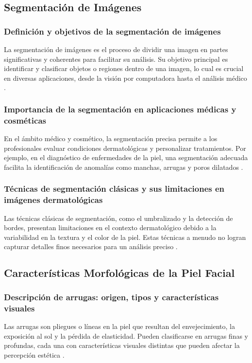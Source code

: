 \subsection{Segmentación de Imágenes}

\subsubsection{Definición y objetivos de la segmentación de imágenes}
La segmentación de imágenes es el proceso de dividir una imagen en partes significativas y coherentes para facilitar su análisis. Su objetivo principal es identificar y clasificar objetos o regiones dentro de una imagen, lo cual es crucial en diversas aplicaciones, desde la visión por computadora hasta el análisis médico \cite{gonzalez2018}.

\subsubsection{Importancia de la segmentación en aplicaciones médicas y cosméticas}
En el ámbito médico y cosmético, la segmentación precisa permite a los profesionales evaluar condiciones dermatológicas y personalizar tratamientos. Por ejemplo, en el diagnóstico de enfermedades de la piel, una segmentación adecuada facilita la identificación de anomalías como manchas, arrugas y poros dilatados \cite{mohammadi2019}.

\subsubsection{Técnicas de segmentación clásicas y sus limitaciones en imágenes dermatológicas}
Las técnicas clásicas de segmentación, como el umbralizado y la detección de bordes, presentan limitaciones en el contexto dermatológico debido a la variabilidad en la textura y el color de la piel. Estas técnicas a menudo no logran capturar detalles finos necesarios para un análisis preciso \cite{yoo2020}.

\subsection{Características Morfológicas de la Piel Facial}

\subsubsection{Descripción de arrugas: origen, tipos y características visuales}
Las arrugas son pliegues o líneas en la piel que resultan del envejecimiento, la exposición al sol y la pérdida de elasticidad. Pueden clasificarse en arrugas finas y profundas, cada una con características visuales distintas que pueden afectar la percepción estética \cite{farage2013}.

